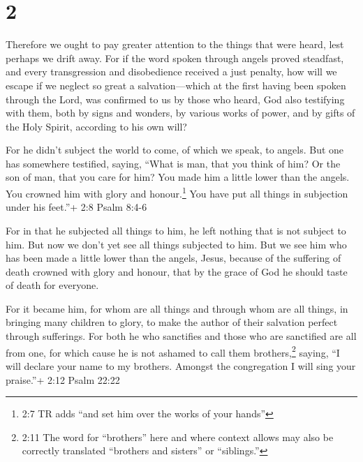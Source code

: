 \hypertarget{section-1}{%
\section{2}\label{section-1}}

 Therefore we ought to pay greater attention to the things
that were heard, lest perhaps we drift away.  For if the
word spoken through angels proved steadfast, and every transgression and
disobedience received a just penalty,  how will we escape if
we neglect so great a salvation---which at the first having been spoken
through the Lord, was confirmed to us by those who heard, 
God also testifying with them, both by signs and wonders, by various
works of power, and by gifts of the Holy Spirit, according to his own
will?

 For he didn't subject the world to come, of which we speak,
to angels.  But one has somewhere testified, saying, ``What
is man, that you think of him? Or the son of man, that you care for him?
 You made him a little lower than the angels. You crowned
him with glory and honour.\footnote{2:7 TR adds ``and set him over the
  works of your hands''}  You have put all things in
subjection under his feet.''+ 2:8 Psalm 8:4-6

For in that he subjected all things to him, he left nothing that is not
subject to him. But now we don't yet see all things subjected to him.
 But we see him who has been made a little lower than the
angels, Jesus, because of the suffering of death crowned with glory and
honour, that by the grace of God he should taste of death for everyone.

 For it became him, for whom are all things and through
whom are all things, in bringing many children to glory, to make the
author of their salvation perfect through sufferings.  For
both he who sanctifies and those who are sanctified are all from one,
for which cause he is not ashamed to call them brothers,\footnote{2:11
  The word for ``brothers'' here and where context allows may also be
  correctly translated ``brothers and sisters'' or ``siblings.''}
 saying, ``I will declare your name to my brothers. Amongst
the congregation I will sing your praise.''+ 2:12 Psalm 22:22

